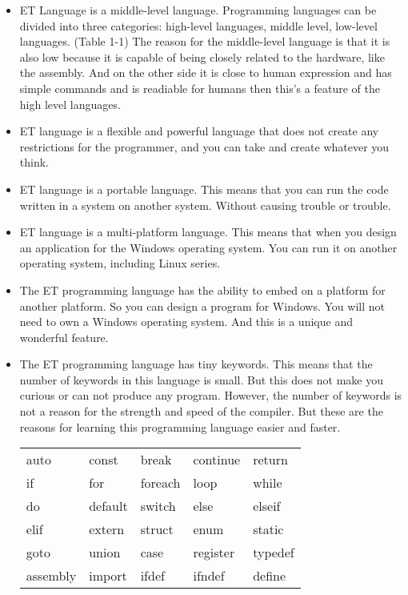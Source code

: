 \documentclass[11pt,fleqn]{book}
\begin{document}
    \begin{itemize}
        \item ET Language is a middle-level language. Programming languages ​​can be divided into three categories: high-level languages, middle level, low-level languages. (Table 1-1) The reason for the middle-level language is that it is also low because it is capable of being closely related to the hardware, like the assembly. And on the other side it is close to human expression and has simple commands and is readiable for humans then this's a feature of the high level languages.
        
        \item ET language is a flexible and powerful language that does not create any restrictions for the programmer, and you can take and create whatever you think.
        
        \item ET language is a portable language. This means that you can run the code written in a system on another system. Without causing trouble or trouble.
        
        \item ET language is a multi-platform language. This means that when you design an application for the Windows operating system. You can run it on another operating system, including Linux series.
        
        \item The ET programming language has the ability to embed on a platform for another platform.
        So you can design a program for Windows. You will not need to own a Windows operating system.
        And this is a unique and wonderful feature.
        
        \item The ET programming language has tiny keywords. This means that the number of keywords in this language is small. But this does not make you curious or can not produce any program.
        However, the number of keywords is not a reason for the strength and speed of the compiler. But these are the reasons for learning this programming language easier and faster. \begin{table}[]
            \centering
    \begin{tabular}{|lllll|}
\hline
    auto    & const & break & continue & return \\
    if  & for  & foreach & loop & while \\
    do  & default & switch & else & elseif \\
    elif    & extern & struct & enum & static \\
    goto & union & case & register & typedef\\
    assembly & import & ifdef & ifndef & define \\ \hline
    

\end{tabular}
\end{table}
\end{itemize}
\end{document}
